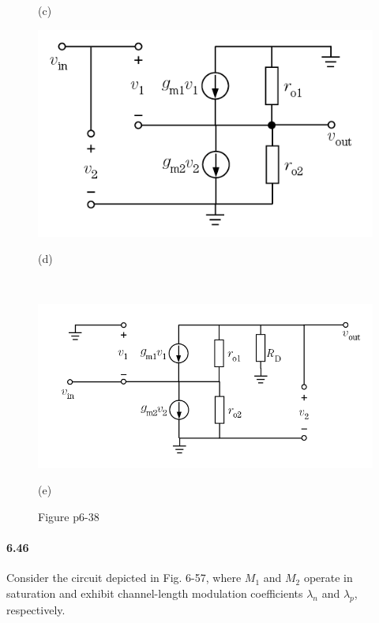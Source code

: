 \documentclass[hyperref, UTF8]{ctexart}
\begin{document}
\begin{figure}[!htb]
\begin{minipage}[t]{0.397\textwidth}
        \caption*{(c)}
        \end{minipage}
        \begin{minipage}[t]{0.347\textwidth}
        \centering
        \includegraphics[width=1\textwidth]{p6-38-d-sol.png}
        \caption*{(d)}
        \end{minipage}
        \\
        \begin{minipage}[t]{0.485\textwidth}
        \centering
        \includegraphics[width=1\textwidth]{p6-38-e-sol.png}
        \caption*{(e)}
        \end{minipage}
        \caption*{Figure p6-38}
    \end{figure}

\paragraph{6.46} \label{6.46}
    Consider the circuit depicted in Fig. 6-57, where $M_1$ and $M_2$ operate in saturation and exhibit channel-length modulation coefficients $\lambda_n$ and $\lambda_p$, respectively.
\end{document}
